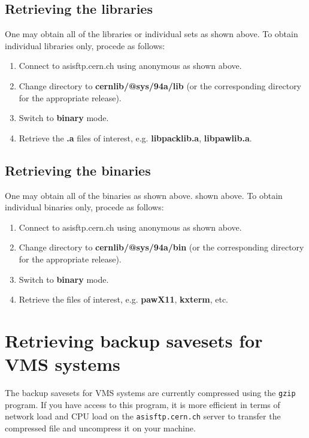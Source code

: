 \subsection{Retrieving the libraries}

One may obtain all of the libraries or individual sets as 
shown above. To obtain individual libraries only, procede as
follows:

\begin{enumerate}
\item
Connect to asisftp.cern.ch using anonymous \ftp{} as shown
above.
\item
Change directory to {\bf cernlib/@sys/94a/lib} (or the corresponding
directory for the appropriate release).
\item
Switch to {\bf binary} mode.
\item
Retrieve the {\bf .a} files of interest, e.g.
{\bf libpacklib.a}, {\bf libpawlib.a}.
\end{enumerate}

\subsection{Retrieving the binaries}

One may obtain all of the binaries as shown above.
shown above. To obtain individual binaries only, procede as
follows:

\begin{enumerate}
\item
Connect to asisftp.cern.ch using anonymous \ftp{} as shown
above.
\item
Change directory to {\bf cernlib/@sys/94a/bin} (or the corresponding
directory for the appropriate release).
\item
Switch to {\bf binary} mode.
\item
Retrieve the files of interest, e.g.
{\bf pawX11}, {\bf kxterm}, etc.
\end{enumerate}

\section{Retrieving backup savesets for VMS systems}

The backup savesets for VMS systems are currently compressed
using the {\tt gzip} program. If you have access to this 
program, it is more efficient in terms of network load
and CPU load on the {\tt asisftp.cern.ch} server to transfer
the compressed file and uncompress it on your machine.

